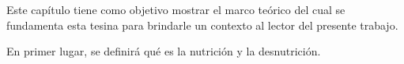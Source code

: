 Este capítulo tiene como objetivo mostrar el marco teórico del cual se fundamenta esta tesina para brindarle un contexto al lector del presente trabajo. 

En primer lugar, se definirá qué es la nutrición y la desnutrición.
